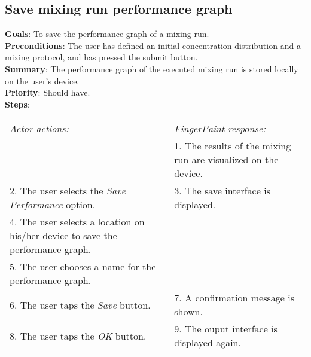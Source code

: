 \begin{appendices}
  \section{Save mixing run performance graph}
  \textbf{Goals}: To save the performance graph of a mixing run.\\
  \textbf{Preconditions}: The user has defined an initial concentration distribution and a mixing protocol, and has pressed the submit button.\\
  \textbf{Summary}: The performance graph of the executed mixing run is stored locally on the user's device.\\
  \textbf{Priority}: Should have.\\
  \textbf{Steps}: \\
  \begin{tabular}{ p{} p{} }
  	\emph{Actor actions:} & \emph{FingerPaint response:} \\
	   & 1. The results of the mixing run are visualized on the device. \\
	 2. The user selects the \emph{Save Performance} option. & 3. The save interface is displayed.\\
	 4. The user selects a location on his/her device to save the performance graph. & \\
	 5. The user chooses a name for the performance graph. & \\
	 6. The user taps the \emph{Save} button. & 7. A confirmation message is shown. \\
	 8. The user taps the \emph{OK} button. & 9. The ouput interface is displayed again. \\
  \end{tabular}


\end{appendices}
